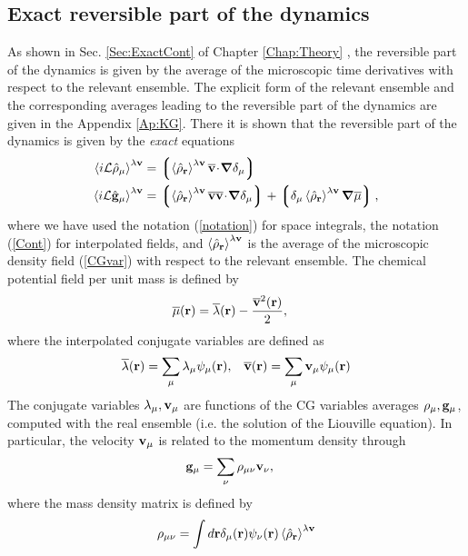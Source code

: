 \documentclass[b5paper,openright,10pt]{book}
\newcommand{\esc}{\!\cdot\!}
\newcommand{\llangle}{\left\langle}
\newcommand{\rrangle}{\right\rangle}
\newcommand{\llg}{\left\lgroup}
\newcommand{\rlg}{\right\rgroup}
\begin{document}
\subsection{Exact reversible part of the dynamics}
As shown in Sec. \ref{Sec:ExactCont} of Chapter \ref{Chap:Theory} , the reversible part
of  the dynamics  is  given by  the average  of  the microscopic  time
derivatives with respect to the  relevant ensemble.  The explicit form
of the relevant ensemble and the corresponding averages leading to the
reversible  part   of  the   dynamics  are   given  in   the  Appendix
\ref{Ap:KG}.  There  it is  shown  that  the  reversible part  of  the
dynamics is given by the \textit{exact} equations
\begin{align}
  \llangle i{\cal L}\hat{\rho}_\mu\rrangle^{\lambda{\bf v}} &=
  \llg\llangle \hat{\rho}_{\bf r}\rrangle^{\lambda{\bf v}}
\overline{\bf v}\esc\boldsymbol{\nabla}\delta_{\mu}\rlg
\nonumber\\
  \llangle i{\cal L}\hat{\bf g}_\mu\rrangle^{\lambda{\bf v}} &=
\llg\llangle \hat{\rho}_{\bf r}\rrangle^{\lambda{\bf v}}
\overline{\bf v}\overline{\bf v}\esc\boldsymbol{\nabla}\delta_{\mu}\rlg
+\llg\delta_\mu\llangle\hat{\rho}_{\bf r}\rrangle^{\lambda{\bf v}}\boldsymbol{\nabla}\overline{\mu}\rlg,
\label{ExactRev}
\end{align}
where we have used the  notation (\ref{notation}) for space integrals,
the  notation  (\ref{Cont})  for interpolated  fields,  and  $\llangle
\hat{\rho}_{\bf  r}\rrangle^{\lambda{\bf v}}$  is the  average of  the
microscopic  density field  (\ref{CGvar})  with  respect to  the
relevant  ensemble.  The  chemical potential  field per  unit mass  is
defined by
\begin{align}
  \overline{\mu}({\bf r})&=\overline{\lambda}({\bf r})-\frac{\overline{\bf v}^2({\bf r})}{2},
\end{align}
where the interpolated conjugate variables are defined as 
\begin{align}
    \overline{\lambda}({\bf r})=\sum_{\mu}{\lambda}_{\mu}\psi_\mu({\bf r}), &&
\overline{\bf v}({\bf r})=\sum_{\mu}{\bf v}_{\mu}\psi_\mu({\bf r})
\end{align}
The conjugate variables $\lambda_\mu,{\bf v}_\mu$ are functions of the
CG variables averages $\rho_\mu,{\bf g}_\mu$, computed with the real ensemble (i.e. the solution of the Liouville equation). In particular, the velocity ${\bf
v}_\mu$ is related to the momentum density through
\begin{align}
  {\bf g}_\mu&=\sum_{\nu}\rho_{\mu\nu}{\bf v}_\nu,
\label{vnu}
\end{align}
where  the mass density matrix is defined by
\begin{align}
  \rho_{\mu\nu} =\int d{\bf r}
\delta_\mu({\bf r})\psi_\nu({\bf r})\llangle\hat{\rho}_{\bf r}\rrangle^{\lambda{\bf v}}
\label{rhomunu}
\end{align}
\end{document}
